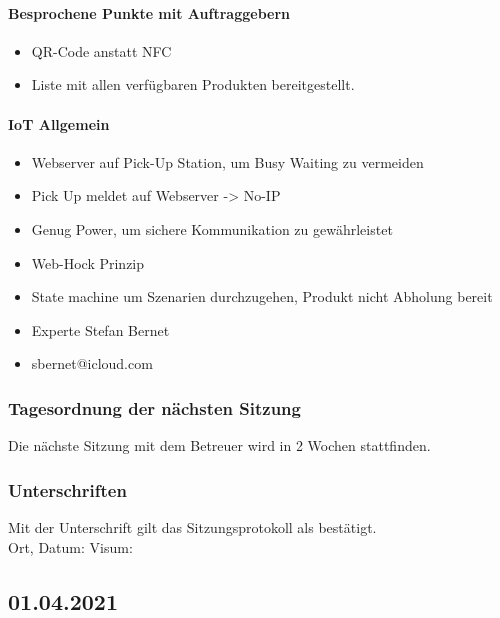 \paragraph{Besprochene Punkte mit Auftraggebern}
\begin{itemize}
	\item QR-Code anstatt NFC	
	\item Liste mit allen verfügbaren Produkten bereitgestellt. 
\end{itemize}
\paragraph{IoT Allgemein}
\begin{itemize}
	\item Webserver auf Pick-Up Station, um Busy Waiting zu vermeiden
	\item Pick Up meldet auf Webserver -> No-IP
	\item Genug Power, um sichere Kommunikation zu gewährleistet
	\item Web-Hock Prinzip
	\item State machine um Szenarien durchzugehen, Produkt nicht Abholung bereit
\end{itemize}
\begin{itemize}
	\item Experte Stefan Bernet
	\item sbernet@icloud.com
\end{itemize}

\subsubsection{Tagesordnung der nächsten Sitzung}
Die nächste Sitzung mit dem Betreuer wird in 2 Wochen stattfinden. 
\subsubsection{Unterschriften}

Mit der Unterschrift gilt das Sitzungsprotokoll als bestätigt.\\

Ort, Datum:	\underline{\hspace*{6cm}}	\hspace*{1cm} Visum:	\underline{\hspace*{4cm}}


\subsection{01.04.2021}
